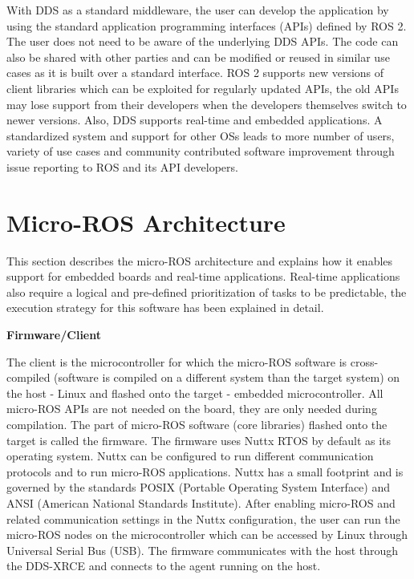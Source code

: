 \documentclass[%
xelatex,
	oneside,		%
	12pt,			%
	parskip=half,	%
	abstracton,
	chapterprefix=true%
    appendixprefix=true]
{scrbook}
\begin{document}
With DDS as a standard middleware, the user can develop the application by using the standard application programming interfaces (APIs) defined by  ROS 2. The user does not need to be aware of the underlying DDS APIs. The code can also be shared with other parties and can be modified or reused in similar use cases as it is built over a standard interface. ROS 2 supports new versions of client libraries which can be exploited for regularly updated APIs, the old APIs may lose support from their developers when the developers themselves switch to newer versions. Also, DDS supports real-time and embedded applications. A standardized system and support for other OSs leads to more number of users, variety of use cases and community contributed software improvement through issue reporting to ROS and its API developers.
	\section{Micro-ROS Architecture}
	\vspace*{0.5cm}
This section describes the micro-ROS architecture and explains how it enables support for embedded boards and real-time applications. Real-time applications also require a logical and pre-defined prioritization of tasks to be predictable, the execution strategy for this software has been explained in detail.
		\vspace*{0.5cm}

 
 
 {\bfseries Firmware/Client}
 
 
 \vspace*{0.5cm}
 The client is the microcontroller for which the micro-ROS software is cross-compiled (software is compiled on a different system than the target system) on the host - Linux and flashed onto the target - embedded microcontroller. All micro-ROS APIs are not needed on the board, they are only needed during compilation. The part of micro-ROS software (core libraries) flashed onto the target is called the firmware. The firmware uses Nuttx RTOS by default as its operating system. Nuttx can be configured to run different communication protocols and to run micro-ROS applications. Nuttx has a small footprint and is governed by the standards POSIX (Portable Operating System Interface) and ANSI (American National Standards Institute). After enabling micro-ROS and related communication settings in the Nuttx configuration, the user can run the micro-ROS nodes on the microcontroller which can be accessed by Linux through Universal Serial Bus (USB). The firmware communicates with the host through the DDS-XRCE and connects to the agent running on the host.
 \vspace*{0.5cm}
 
\end{document}
